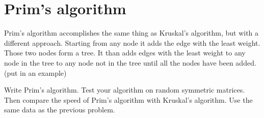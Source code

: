 \section*{Prim's algorithm}

Prim's algorithm accomplishes the same thing as Kruskal's algorithm, but with a different approach. Starting from any node it adds the edge with the least weight. Those two nodes form a tree. It than adds edges with the least weight to any node in the tree to any node not in the tree until all the nodes have been added. (put in an example)

\begin{problem}
Write Prim's algorithm. Test your algorithm on random symmetric matrices. Then compare the speed of Prim's algorithm with Kruskal's algorithm. Use the same data as the previous problem. 
\end{problem}
